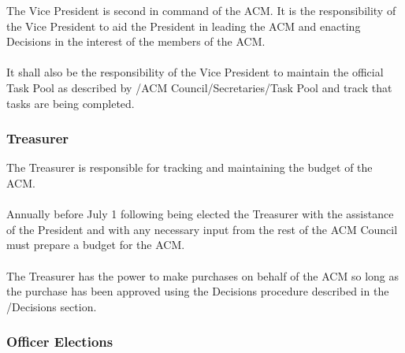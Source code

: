 \documentclass[12pt,titlepage]{article}
\begin{document}
The Vice President is second in command of the ACM. It is the responsibility of the Vice President to aid the President in leading the ACM and enacting Decisions in the interest of the members of the ACM.\\
\\
It shall also be the responsibility of the Vice President to maintain the official Task Pool as described by /ACM Council/Secretaries/Task Pool and track that tasks are being completed.\\

\subsubsection{Treasurer}

The Treasurer is responsible for tracking and maintaining the budget of the ACM.\\
\\
Annually before July 1 following being elected the Treasurer with the assistance of the President and with any necessary input from the rest of the ACM Council must prepare a budget for the ACM.\\
\\
The Treasurer has the power to make purchases on behalf of the ACM so long as the purchase has been approved using the Decisions procedure described in the /Decisions section.

\subsubsection{Officer Elections}
\end{document}

